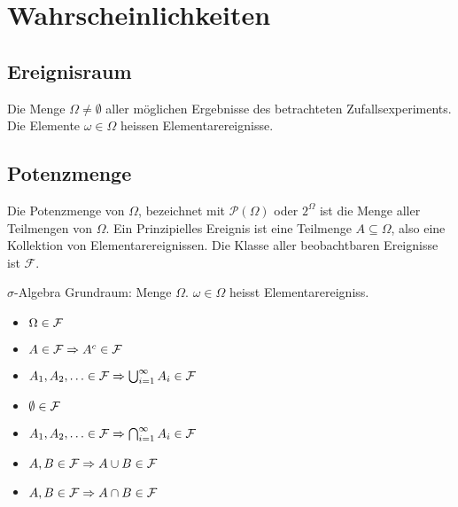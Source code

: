 

\section{Wahrscheinlichkeiten}
\subsection{Ereignisraum}
Die Menge $\Omega \neq \emptyset$ aller möglichen Ergebnisse des betrachteten
Zufallsexperiments. Die Elemente $\omega \in \Omega$ heissen
Elementarereignisse.
\subsection{Potenzmenge}
Die Potenzmenge von $\Omega$, bezeichnet mit $\mathcal{P} (\Omega)$ oder
$2^\Omega$ ist die Menge aller Teilmengen von $\Omega$. Ein Prinzipielles
Ereignis ist eine Teilmenge $A \subseteq \Omega$, also eine Kollektion von
Elementarereignissen. Die Klasse aller beobachtbaren Ereignisse ist
$\mathcal{F}$.
\begin{definition}{$\sigma$-Algebra}
Grundraum: Menge $\Omega$. $\omega \in \Omega$ heisst Elementarereigniss.
\begin{itemize}
  \item $\Omega \in \mathcal{F}$
  \item $A \in \mathcal{F} \Rightarrow A^c \in \mathcal{F}$
  \item $A_1 , A_2 , \ldots \in \mathcal{F} \Rightarrow \bigcup_{i=1}^\infty A_i \in \mathcal{F}$
  \item $\emptyset \in \mathcal{F}$
  \item $A_1 , A_2 , \ldots \in \mathcal{F} \Rightarrow \bigcap_{i=1}^\infty A_i \in \mathcal{F}$
  \item $A,B \in \mathcal{F} \Rightarrow A \cup B \in \mathcal{F}$
  \item $A,B \in \mathcal{F} \Rightarrow A \cap B \in \mathcal{F}$
\end{itemize}	
\end{definition}

